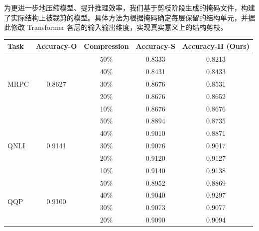 \documentclass[UTF8,openany]{ctexbook}
\begin{document}
为更进一步地压缩模型、提升推理效率，我们基于剪枝阶段生成的掩码文件，构建了实际结构上被裁剪的模型。具体方法为根据掩码确定每层保留的结构单元，并据此修改 Transformer 各层的输入输出维度，实现真实意义上的结构剪枝。

\begin{table}[H]
    \centering
    \begin{tabular}{lcccc}
    \toprule
    Task & Accuracy-O & Compression & Accuracy-S & \textbf{Accuracy-H (Ours)} \\
    \midrule
    \multirow{5}{*}{MRPC} 
         & \multirow{5}{*}{0.8627} & 50\% & \cellcolor{lightgray}0.8333 & \cellcolor{darkgray}0.8213 \\ %
         &                         & 40\% & \cellcolor{lightgray}0.8431 & \cellcolor{darkgray}0.8433 \\ %
         &                         & 30\% & \cellcolor{lightgray}0.8676 & \cellcolor{darkgray}0.8531 \\ %
         &                         & 20\% & \cellcolor{lightgray}0.8676 & \cellcolor{darkgray}0.8652 \\
         &                         & 10\% & \cellcolor{lightgray}0.8676 & \cellcolor{darkgray}0.8676 \\
    \midrule
    \multirow{5}{*}{QNLI} 
         & \multirow{5}{*}{0.9141} & 50\% & \cellcolor{lightgray}0.8894 & \cellcolor{darkgray}0.8735 \\
         &                         & 40\% & \cellcolor{lightgray}0.9010 & \cellcolor{darkgray}0.8871 \\
         &                         & 30\% & \cellcolor{lightgray}0.9076 & \cellcolor{darkgray}0.9017 \\
         &                         & 20\% & \cellcolor{lightgray}0.9120 & \cellcolor{darkgray}0.9127 \\
         &                         & 10\% & \cellcolor{lightgray}0.9140 & \cellcolor{darkgray}0.9138 \\
    \midrule
    \multirow{5}{*}{QQP} 
         & \multirow{5}{*}{0.9100} & 50\% & \cellcolor{lightgray}0.8952 & \cellcolor{darkgray}0.8869 \\
         &                         & 40\% & \cellcolor{lightgray}0.9040 & \cellcolor{darkgray}0.9297 \\
         &                         & 30\% & \cellcolor{lightgray}0.9073 & \cellcolor{darkgray}0.9077 \\
         &                         & 20\% & \cellcolor{lightgray}0.9090 & \cellcolor{darkgray}0.9094 \\

\end{tabular}
\end{table}
\end{document}
